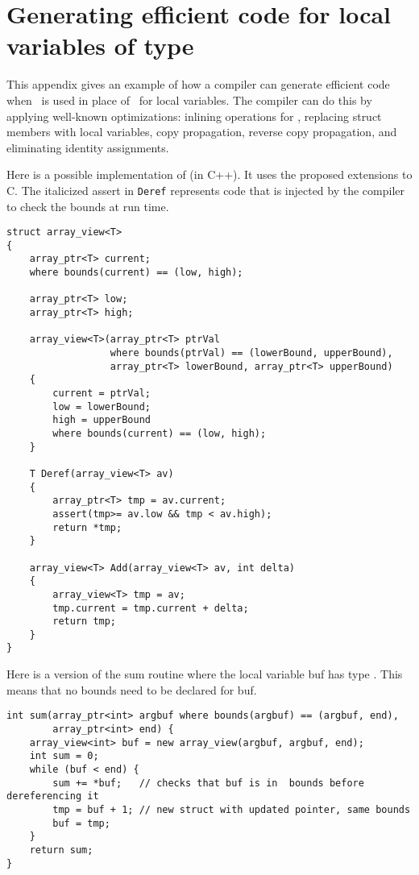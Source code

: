 
\chapter{Generating efficient code for local variables of type \arrayview}\label{appendix-a-generating-efficient-code-for-local-variables-of-type-arrayux5fview}

This appendix gives an example of how a compiler can generate efficient
code when \arrayview\ is used in place of \arrayptr\
for local variables. The compiler can do this by applying well-known
optimizations: inlining operations for \arrayview , replacing
struct members with local variables, copy propagation, reverse copy
propagation, and eliminating identity assignments.

Here is a possible implementation of \arrayviewT (in C++). It
uses the proposed extensions to C. The italicized assert in
\texttt{Deref} represents code that is injected by the compiler to check
the bounds at run time.

\begin{verbatim}
struct array_view<T>
{
    array_ptr<T> current;
    where bounds(current) == (low, high);

    array_ptr<T> low;
    array_ptr<T> high;
      
    array_view<T>(array_ptr<T> ptrVal 
                  where bounds(ptrVal) == (lowerBound, upperBound),
                  array_ptr<T> lowerBound, array_ptr<T> upperBound)
    {
        current = ptrVal;
        low = lowerBound;
        high = upperBound
        where bounds(current) == (low, high);
    }

    T Deref(array_view<T> av) 
    {
        array_ptr<T> tmp = av.current;
        assert(tmp>= av.low && tmp < av.high);
        return *tmp;
    }

    array_view<T> Add(array_view<T> av, int delta) 
    {
        array_view<T> tmp = av;
        tmp.current = tmp.current + delta;
        return tmp;
    }
}
\end{verbatim}

Here is a version of the sum routine where the local variable buf has
type \arrayview. This means that no bounds need to be declared
for buf.

\begin{verbatim}
int sum(array_ptr<int> argbuf where bounds(argbuf) == (argbuf, end), 
        array_ptr<int> end) {
    array_view<int> buf = new array_view(argbuf, argbuf, end);
    int sum = 0;
    while (buf < end) {
        sum += *buf;   // checks that buf is in  bounds before dereferencing it        
        tmp = buf + 1; // new struct with updated pointer, same bounds
        buf = tmp;
    }
    return sum;
}
\end{verbatim}

